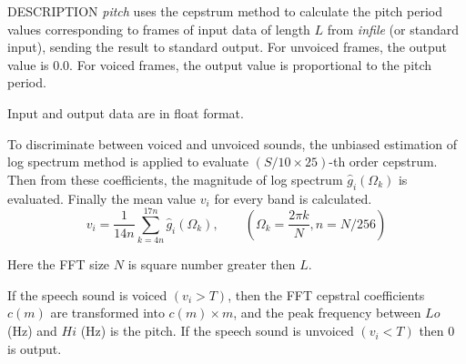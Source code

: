 \begin{synopsis}
\item[pitch] [ --s $S$ ] [ --l $L$ ] [ --t $T$ ]
 [ --L $Lo$ ] [ --H $Hi$ ] [ --e $E$ ]
\item[\ ~~~~~] [ --i $I$ ] [ --j $J$ ] [ --d $D$ ] [ {\em infile} ] 
\end{synopsis}

\begin{qsection}{DESCRIPTION}
{\em pitch} uses the cepstrum method to calculate the pitch period values
corresponding to frames of input data of length $L$ 
from {\em infile} (or standard input), 
sending the result to standard output. 
For unvoiced frames, the output value is 0.0. 
For voiced frames, the output value is proportional to the pitch period.

Input and output data are in float format.

To discriminate between voiced and unvoiced sounds,
the unbiased estimation of log spectrum method is applied
to evaluate $(S/10 \times 25)$-th order cepstrum.
Then from these coefficients, the magnitude of log spectrum
$\hat{g}_i(\Omega_k)$ is evaluated.
Finally the mean value $v_i$ for every band is calculated.
\begin{displaymath}
v_i = \frac{1}{14 n}\sum_{k = 4 n}^{17 n}\hat{g}_i(\Omega_k),\qquad (\Omega_k = \frac{2 \pi k}{N},n = N /256)
\end{displaymath}

Here the FFT size $N$ is square number greater then $L$.

If the speech sound is voiced $(v_i > T)$,
then the FFT cepstral coefficients $c(m)$ are transformed
into $c(m) \times m$,
and the peak frequency between $Lo$ (Hz) and $Hi$ (Hz)
is the pitch.
If the speech sound is unvoiced $(v_i < T)$
then $0$ is output.

\end{qsection}

\begin{options}
\end{options}

